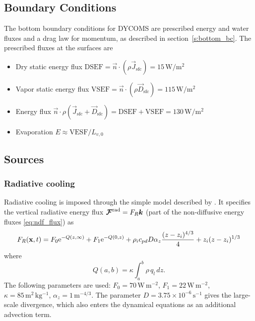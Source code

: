 \documentclass{report}
\begin{document}
\subsection{Boundary Conditions}

The bottom boundary conditions for DYCOMS are prescribed energy and water fluxes and a drag law for momentum, as described in section~\ref{s:bottom_bc}. The prescribed fluxes at the surfaces are
\begin{itemize} 
\item Dry static energy flux $\mathrm{DSEF} = \vec{n} \cdot (\rho \vec{J}_{\mathrm{sfc}}) = 15\,\mathrm{W/m^2}$
\item Vapor static energy flux $\mathrm{VSEF} = \vec{n} \cdot (\rho \vec{D}_{\mathrm{sfc}}) = 115\,\mathrm{W/m^2}$
\item Energy flux $\vec{n} \cdot \rho (\vec{J}_{\mathrm{sfc}} + \vec{D}_{\mathrm{sfc}}) = \mathrm{DSEF + VSEF} = 130\,\mathrm{W/m^2}$
\item Evaporation $E \approx \mathrm{VESF}/L_{v,0}$
\end{itemize}

\subsection{Sources}

\subsubsection{Radiative cooling}
Radiative cooling is imposed through the simple model described by \cite{Stevens05a}. It specifies the vertical radiative energy flux $\boldsymbol{{\mathcal{F}}}^{\mathrm{rad}} = F_R \boldsymbol{{k}}$ (part of the non-diffusive energy fluxes \eqref{eq:ndf_flux}) as
\begin{equation}
    \label{e:radiativeStevens05}
    F_{R}({\bf x}, t) = F_0{\rm e}^{-Q(z,\infty)} +
    F_1{\rm e}^{-Q(0, z)} +
    \rho_i c_{pd} D \alpha_z\frac{(z-z_i)^{4/3}}{4} + z_i(z - z_i)^{1/3}
\end{equation}
where 
\begin{equation}
    Q(a,b) = \kappa\int_{a}^{b}\rho\,q_l\,dz.
\end{equation}
The following parameters are used:
$F_0=70\,\mathrm{W\,m^{-2}}$, $F_1=22\,\mathrm{W\,m^{-2}}$, $\kappa=85\,\mathrm{m^2\,kg^{-1}}$, $\alpha_z=1\,\mathrm{m^{-4/3}}$. The parameter $D=3.75\times 10^{-6}\,\mathrm{s^{-1}}$ gives the large-scale divergence, which also enters the dynamical equations as an additional advection term.  
\end{document}
